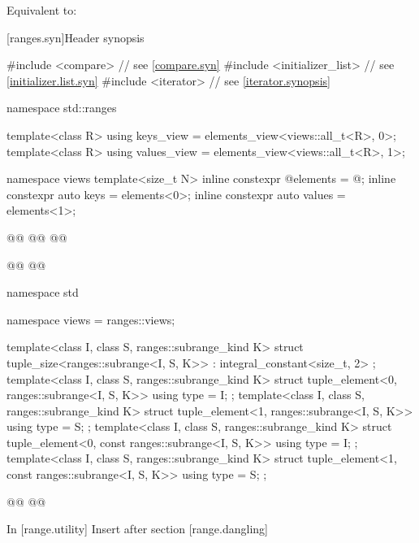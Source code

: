 \documentclass{wg21}
\begin{document}
\begin{itemdescr}
    \pnum
    \effects
    Equivalent to: 
\end{itemdescr}


[ranges.syn]{Header  synopsis}
%
\begin{codeblock}
#include <compare>              // see \ref{compare.syn}
#include <initializer_list>     // see \ref{initializer.list.syn}
#include <iterator>             // see \ref{iterator.synopsis}

namespace std::ranges {
    template<class R>
    using keys_view = elements_view<views::all_t<R>, 0>;
    template<class R>
    using values_view = elements_view<views::all_t<R>, 1>;

    namespace views {
        template<size_t N>
        inline constexpr @\unspec@ elements = @\unspec@ ;
        inline constexpr auto keys = elements<0>;
        inline constexpr auto values = elements<1>;
    }

    @@
    @@
    @@

    @@
    @@
}
namespace std {
    namespace views = ranges::views;

    template<class I, class S, ranges::subrange_kind K>
    struct tuple_size<ranges::subrange<I, S, K>>
    : integral_constant<size_t, 2> {};
    template<class I, class S, ranges::subrange_kind K>
    struct tuple_element<0, ranges::subrange<I, S, K>> {
        using type = I;
    };
    template<class I, class S, ranges::subrange_kind K>
    struct tuple_element<1, ranges::subrange<I, S, K>> {
        using type = S;
    };
    template<class I, class S, ranges::subrange_kind K>
    struct tuple_element<0, const ranges::subrange<I, S, K>> {
        using type = I;
    };
    template<class I, class S, ranges::subrange_kind K>
    struct tuple_element<1, const ranges::subrange<I, S, K>> {
        using type = S;
    };

    @@
    @@
}

\end{codeblock}

In [range.utility] Insert after section [range.dangling]
\end{document}
